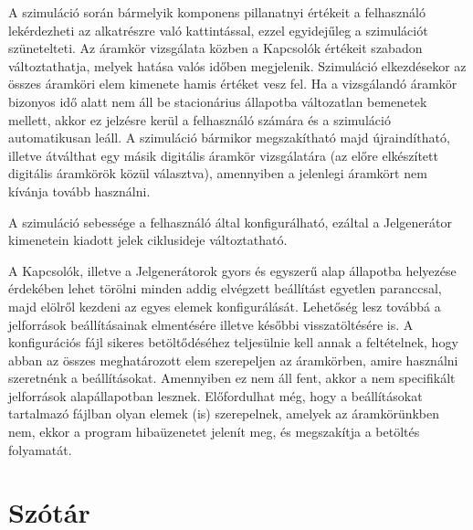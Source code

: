A szimuláció során bármelyik komponens pillanatnyi értékeit a felhasználó lekérdezheti az alkatrészre való kattintással, ezzel egyidejűleg a szimulációt szünetelteti. Az áramkör vizsgálata közben a Kapcsolók értékeit szabadon változtathatja, melyek hatása valós időben megjelenik. Szimuláció elkezdésekor az összes áramköri elem kimenete hamis értéket vesz fel. Ha a vizsgálandó áramkör bizonyos idő alatt nem áll be stacionárius állapotba változatlan bemenetek mellett, akkor ez jelzésre kerül a felhasználó számára és a szimuláció automatikusan leáll. A szimuláció bármikor megszakítható majd újraindítható, illetve átválthat egy másik digitális áramkör vizsgálatára (az előre elkészített digitális áramkörök közül választva), amennyiben a jelenlegi áramkört nem kívánja tovább használni.

A szimuláció sebessége a felhasználó által konfigurálható, ezáltal a Jelgenerátor kimenetein kiadott jelek ciklusideje változtatható.

A Kapcsolók, illetve a Jelgenerátorok gyors és egyszerű alap állapotba helyezése érdekében lehet törölni minden addig elvégzett beállítást egyetlen paranccsal, majd elölről kezdeni az egyes elemek konfigurálását. Lehetőség lesz továbbá a jelforrások beállításainak elmentésére illetve későbbi visszatöltésére is. A konfigurációs fájl sikeres betöltődéséhez teljesülnie kell annak a feltételnek, hogy abban az összes meghatározott elem szerepeljen az áramkörben, amire használni szeretnénk a beállításokat. Amennyiben ez nem áll fent, akkor a nem specifikált jelforrások alapállapotban lesznek. Előfordulhat még, hogy a beállításokat tartalmazó fájlban olyan elemek (is) szerepelnek, amelyek az áramkörünkben nem, ekkor a program hibaüzenetet jelenít meg, és megszakítja a betöltés folyamatát.

\section{Szótár}

